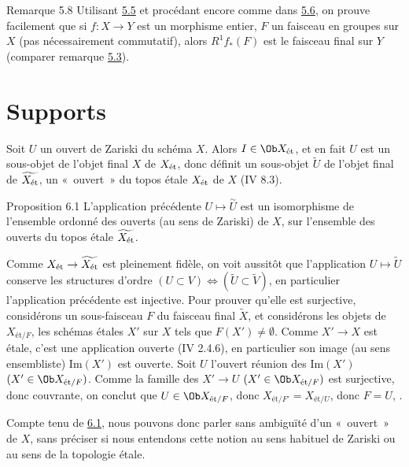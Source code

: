 \documentclass[10pt]{../fichiers-configuration-latex/smfart}
\begin{document}
\begin{enonce*}[remark]{Remarque 5.8}
Utilisant \hyperref[VIII.prop5.5]{5.5} et procédant encore comme dans
\hyperref[VIII.cor5.6]{5.6}, on prouve facilement que si $f : X \to Y$ est un
morphisme entier, $F$ un faisceau en groupes sur $X$ (pas
nécessairement commutatif), alors $R^1 f_{\ast} (F)$ est le faisceau
final sur $Y$ (comparer remarque \hyperref[VIII.rem5.3]{5.3}).
\end{enonce*}

\section{Supports}\pageoriginale{}

Soit $U$ un ouvert de Zariski du schéma $X$. Alors $I \in \Ob
X_{\text{\rm ét}}$,
et en fait $U$ est un sous-objet de l'objet final $X$ de $X_{\text{\rm
    ét}}$,
donc définit un sous-objet $\widetilde{U}$ de l'objet final de
$\widetilde{X_{\text{\rm ét}}}$, \ie un « ouvert » du topos
étale $X_{\text{\rm ét}}$
de $X$ (IV 8.3).

\begin{enonce*}{Proposition 6.1}
L'application précédente $U \mapsto \overset{\sim}{U}$ est un
isomorphisme de l'ensemble ordonné des ouverts (au sens de Zariski) de
$X$, sur l'ensemble des ouverts du topos étale
$\widetilde{X_{\text{\rm ét}}}$.
\end{enonce*}

Comme $X_{\text{\rm ét}} \to \widetilde{X_{\text{\rm ét}}}$ est
pleinement fidèle, on
voit aussitôt que l'application $U \mapsto \widetilde{U}$ conserve
les structures d'ordre \ie $(U \subset V) \Leftrightarrow
(\widetilde{U} \subset \widetilde{V})$, en particulier
l'application précédente est injective. Pour prouver qu'elle est
surjective, considérons un sous-faisceau $F$ du faisceau final
$\widetilde{X}$, et considérons les objets de $X_{\text{ét}/ F}$, \ie
les schémas étales $X'$ sur $X$ tels que $F(X') \neq ∅$. Comme
$X' \to X$ est étale, c'est une application ouverte (\EGA IV 2.4.6), en
particulier son image (au sens ensembliste) $\text{Im}(X')$ est
ouverte. Soit $U$ l'ouvert réunion des $\text{Im}(X')$ $(X'\in \Ob
X_{\text{ét} /  F})$. Comme la famille des $X'\to U$ $(X'\in \Ob
X_{\text{ét}/F})$ est
surjective, donc couvrante, on conclut que $U \in \Ob X_{\text{ét}/F}$, donc
$ X_{\text{ét}/F'} =  X_{\text{ét}/U}$, donc $F = U$, \cqfd.

Compte tenu de \hyperref[VIII.prop6.1]{6.1}, nous pouvons donc parler sans
ambiguïté d'un « ouvert » de $X$, sans préciser si nous
entendons cette notion au sens habituel de Zariski ou au sens de la
topologie étale.
\end{document}
